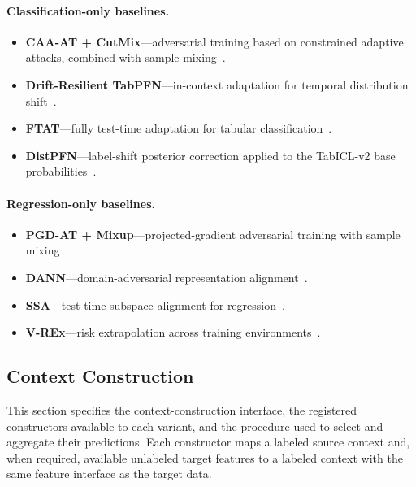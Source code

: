 \paragraph{Classification-only baselines.}
\begin{itemize}
  \setlength{\itemsep}{1pt}
  \setlength{\parskip}{0pt}
  \item \textbf{CAA-AT + CutMix}---adversarial training based on constrained
  adaptive attacks, combined with sample mixing~\citep{simonetto2024caa,yun2019cutmix,
  madry2018adversarial}.
  \item \textbf{Drift-Resilient TabPFN}---in-context adaptation for temporal
  distribution shift~\citep{helli2024drifttabpfn}.
  \item \textbf{FTAT}---fully test-time adaptation for tabular
  classification~\citep{zhou2025ftat}.
  \item \textbf{DistPFN}---label-shift posterior correction applied to the
  TabICL-v2 base probabilities~\citep{lee2026distpfn}.
\end{itemize}

\paragraph{Regression-only baselines.}
\begin{itemize}
  \setlength{\itemsep}{1pt}
  \setlength{\parskip}{0pt}
  \item \textbf{PGD-AT + Mixup}---projected-gradient adversarial training with
  sample mixing~\citep{madry2018adversarial,zhang2018mixup}.
  \item \textbf{DANN}---domain-adversarial representation
  alignment~\citep{ganin2016domain}.
  \item \textbf{SSA}---test-time subspace alignment for
  regression~\citep{adachi2025ssa}.
  \item \textbf{V-REx}---risk extrapolation across training
  environments~\citep{krueger2021vrex}.
\end{itemize}

\subsection{Context Construction}
\label{app:context_construction}

This section specifies the context-construction interface, the registered
constructors available to each variant, and the procedure used to select and
aggregate their predictions.  Each constructor maps a labeled source context
and, when required, available unlabeled target features to a labeled context with the
same feature interface as the target data.

